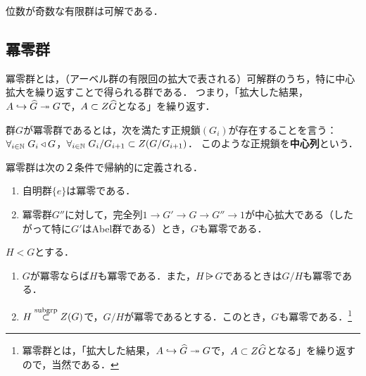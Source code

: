 \documentclass[uplatex,dvipdfmx]{jsreport}
\begin{document}
\begin{theorem}
    位数が奇数な有限群は可解である．
\end{theorem}

\subsection{冪零群}

\begin{tcolorbox}[colframe=ForestGreen, colback=ForestGreen!10!white,breakable,colbacktitle=ForestGreen!40!white,coltitle=black,fonttitle=\bfseries\sffamily,
title=]
    冪零群とは，（アーベル群の有限回の拡大で表される）可解群のうち，特に中心拡大を繰り返すことで得られる群である．
    つまり，「拡大した結果，$A\hookrightarrow\widehat{G}\twoheadrightarrow G$で，$A\subset Z\widehat{G}$となる」を繰り返す．
\end{tcolorbox}

\begin{definition}
    群$G$が冪零群であるとは，次を満たす正規鎖$(G_i)$が存在することを言う：$\forall_{i\in\mathbb{N}}\;G_i\triangleleft G$，$\forall_{i\in\mathbb{N}}\;G_i/G_{i+1}\subset Z(G/G_{i+1})$．
    このような正規鎖を\textbf{中心列}という．
\end{definition}
\begin{remarks}[同値な定義]
    冪零群は次の２条件で帰納的に定義される．
    \begin{enumerate}
        \item 自明群$\{e\}$は冪零である．
        \item 冪零群$G''$に対して，完全列$1\to G'\to G\to G''\to 1$が中心拡大である（したがって特に$G'$はAbel群である）とき，$G$も冪零である．
    \end{enumerate}
\end{remarks}

\begin{proposition}[冪零性の遺伝]\label{prop-propagation-of-nilpotentness}
    $H< G$とする．
    \begin{enumerate}
        \item $G$が冪零ならば$H$も冪零である．また，$H\rsub G$であるときは$G/H$も冪零である．
        \item $H\overset{\mathrm{subgrp}}{\subset} Z(G)$で，$G/H$が冪零であるとする．このとき，$G$も冪零である．\footnote{冪零群とは，「拡大した結果，$A\hookrightarrow\widehat{G}\twoheadrightarrow G$で，$A\subset Z\widehat{G}$となる」を繰り返すので，当然である．}
    \end{enumerate}
\end{proposition}
\end{document}
